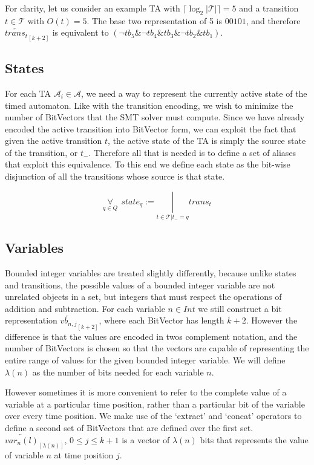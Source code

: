 \documentclass[a4paper,12pt]{article}
\newcommand*\BitAnd{\mathbin{\&}}
\newcommand*\BitOr{\mathbin{|}}
\begin{document}
For clarity, let us consider an example TA with
\(\lceil\log_2 |\mathcal{T}|\rceil = 5\) and a transition \(t \in \mathcal{T}\)
with \(O(t) = 5\). The base two representation of 5 is \(00101\), and therefore
\(\overleftarrow{trans_t}_{[k+2]}\) is equivalent to \((\neg tb_5 \BitAnd
\neg tb_4 \BitAnd tb_3 \BitAnd \neg tb_2 \BitAnd tb_1)\).

\subsection{States}\label{encoding-states}

For each TA \(\mathcal{A}_i \in \mathcal{A}\), we need a way to represent the
currently active state of the timed automaton. Like with the transition
encoding, we wish to minimize the number of BitVectors that the SMT solver must
compute. Since we have already encoded the active transition into BitVector
form, we can exploit the fact that given the active transition \(t\), the active
state of the TA is simply the source state of the transition, or \(t_{-}\).
Therefore all that is needed is to define a set of aliases that exploit this
equivalence. To this end we define each state as the bit-wise disjunction of all
the transitions whose source is that state.

\[\underset{q \in Q}{\forall}\ \ state_q := \underset{t \in \mathcal{T}|t_{-} = q}{\BitOr}trans_t\]

\subsection{Variables}\label{encoding-variables}

Bounded integer variables are treated slightly differently, because unlike
states and transitions, the possible values of a bounded integer variable are
not unrelated objects in a set, but integers that must respect the operations of
addition and subtraction. For each variable \(n \in Int\) we still construct a
bit representation \(\overleftarrow{vb_{n,j}}_{[k+2]}\), where each BitVector
has length \(k+2\). However the difference is that the values are encoded in twos
complement notation, and the number of BitVectors is chosen so that the vectors
are capable of representing the entire range of values for the given bounded
integer variable. We will define \(\lambda(n)\) as the number of bits needed for
each variable \(n\).

However sometimes it is more convenient to refer to the complete value of a
variable at a particular time position, rather than a particular bit of the
variable over every time position. We make use of the `extract' and
`concat' operators to define a second set of BitVectors that are defined over
the first set. \(\overleftarrow{var_{n}(l)}_{[\lambda(n)]}\), \(0 \leq j \leq
k+1\) is a vector of \(\lambda(n)\) bits that represents the value of variable
\(n\) at time position \(j\).
\end{document}
